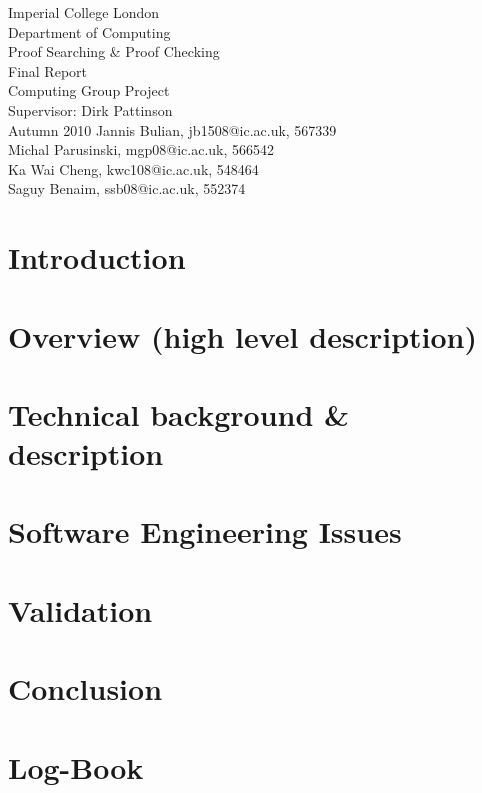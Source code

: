 \documentclass[12pt,a4paper]{scrartcl}
\begin{document}
\thispagestyle{empty}
\begin{titlepage}
  \begin{center}
    \vspace*{\fill}
            {{\Large Imperial College London\\ Department of Computing\\}}
            \vfill {{\Huge Proof Searching \& Proof Checking \\
                \vspace{0.2cm}
                     Final Report}}\\
            \vfill {{\large Computing Group Project\\ 
                Supervisor: Dirk Pattinson\\ Autumn 2010}}
            \vfill {Jannis Bulian, jb1508@ic.ac.uk, 567339 \\
                    Michal Parusinski, mgp08@ic.ac.uk, 566542 \\
                    Ka Wai Cheng, kwc108@ic.ac.uk, 548464\\
                    Saguy Benaim, ssb08@ic.ac.uk, 552374}
  \end{center}
\end{titlepage}

\newpage

\tableofcontents
\thispagestyle{empty}

\newpage

\section{Introduction}


\section{Overview (high level description)}


\section{Technical background \& description}



\section{Software Engineering Issues}



\section{Validation}


\section{Conclusion}


\newpage
\appendix
\section{Log-Book}


\newpage
\singlespacing



\end{document}
